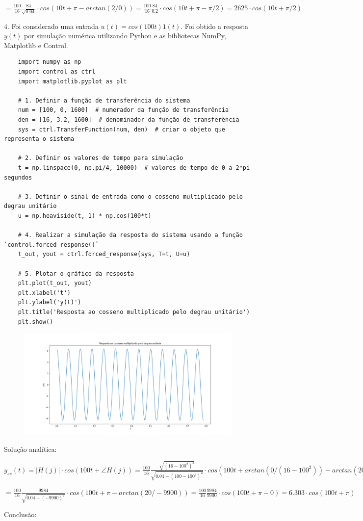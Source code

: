 \documentclass[10pt]{article}
\begin{document}
$= \frac{100}{16} \frac{84}{\sqrt{0.04}} \cdot cos(10 t + \pi - arctan(2/0)) = \frac{100}{16} \frac{84}{0.2} \cdot cos(10 t + \pi - \pi/2) = 2625 \cdot cos(10 t + \pi/2)$

4. Foi considerado uma entrada $u(t) = cos(100 t) 1(t)$. Foi obtido a resposta $y(t)$ por simulação numérica utilizando Python
e as bibliotecas NumPy, Matplotlib e Control.

\begin{verbatim}
    import numpy as np
    import control as ctrl
    import matplotlib.pyplot as plt

    # 1. Definir a função de transferência do sistema
    num = [100, 0, 1600]  # numerador da função de transferência
    den = [16, 3.2, 1600]  # denominador da função de transferência
    sys = ctrl.TransferFunction(num, den)  # criar o objeto que representa o sistema

    # 2. Definir os valores de tempo para simulação
    t = np.linspace(0, np.pi/4, 10000)  # valores de tempo de 0 a 2*pi segundos

    # 3. Definir o sinal de entrada como o cosseno multiplicado pelo degrau unitário
    u = np.heaviside(t, 1) * np.cos(100*t)

    # 4. Realizar a simulação da resposta do sistema usando a função `control.forced_response()`
    t_out, yout = ctrl.forced_response(sys, T=t, U=u)

    # 5. Plotar o gráfico da resposta
    plt.plot(t_out, yout)
    plt.xlabel('t')
    plt.ylabel('y(t)')
    plt.title('Resposta ao cosseno multiplicado pelo degrau unitário')
    plt.show()
\end{verbatim}

\begin{figure}[h]
    \includegraphics[scale=0.4]{questao4.png}
    \centering
\end{figure}

Solução analítica:

$y_{ss}(t) = |H(j)| \cdot cos(100 t + \angle H(j)) = \frac{100}{16} \frac{\sqrt{(16-100^2)^2}}{\sqrt{0.04 + (100 - 100^2)^2}} \cdot cos(100 t + arctan(0/(16 - 100^2)) - arctan(20/(100 - 100^2))) =$

$= \frac{100}{16} \frac{9984}{\sqrt{0.04 + (-9900)^2}} \cdot cos(100 t + \pi - arctan(20/-9900)) = \frac{100}{16} \frac{9984}{9900} \cdot cos(100 t + \pi - 0) = 6.303 \cdot cos(100 t + \pi)$

Conclusão:
\end{document}
